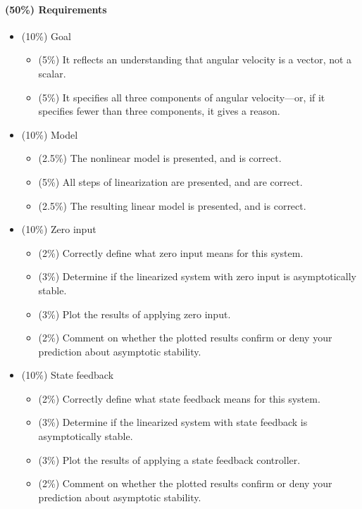 \documentclass[12pt]{article}
\begin{document}
\paragraph{(50\%) Requirements}
\begin{itemize}
	\item (10\%) Goal
	\begin{itemize}
		\item (5\%) It reflects an understanding that angular velocity is a vector, not a scalar.
		\item (5\%) It specifies all three components of angular velocity---or, if it specifies fewer than three components, it gives a reason.
	\end{itemize}

	\item (10\%) Model
	\begin{itemize}	
		\item (2.5\%) The nonlinear model is presented, and is correct.
		\item (5\%) All steps of linearization are presented, and are correct.
		\item (2.5\%) The resulting linear model is presented, and is correct.
	\end{itemize}

	\item (10\%) Zero input
	\begin{itemize}
		\item (2\%) Correctly define what zero input means for this system.
		\item (3\%) Determine if the linearized system with zero input is asymptotically stable.
		\item (3\%) Plot the results of applying zero input.
		\item (2\%) Comment on whether the plotted results confirm or deny your prediction about asymptotic stability. 
	\end{itemize}

	\item (10\%) State feedback
	\begin{itemize}
		\item (2\%) Correctly define what state feedback means for this system.
		\item (3\%) Determine if the linearized system with state feedback is asymptotically stable.
		\item (3\%) Plot the results of applying a state feedback controller.
		\item (2\%) Comment on whether the plotted results confirm or deny your prediction about asymptotic stability. 
	\end{itemize}


\end{itemize}
\end{document}
